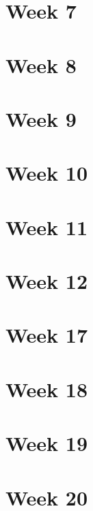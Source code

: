 \documentclass{article}
\begin{document}
\section{Week 7}

\section{Week 8}

\section{Week 9}

\section{Week 10}

\section{Week 11}

\section{Week 12}

\section{Week 17}

\section{Week 18}

\section{Week 19}

\section{Week 20}
\end{document}
